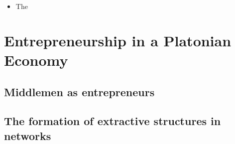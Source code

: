 \documentclass[10pt]{beamer}
\begin{document}
\begin{frame}
\begin{itemize}
\item The
\end{itemize}
\end{frame}

\section{Entrepreneurship in a Platonian Economy}

\subsection{Middlemen as entrepreneurs}

\subsection{The formation of extractive structures in networks}
\end{document}
